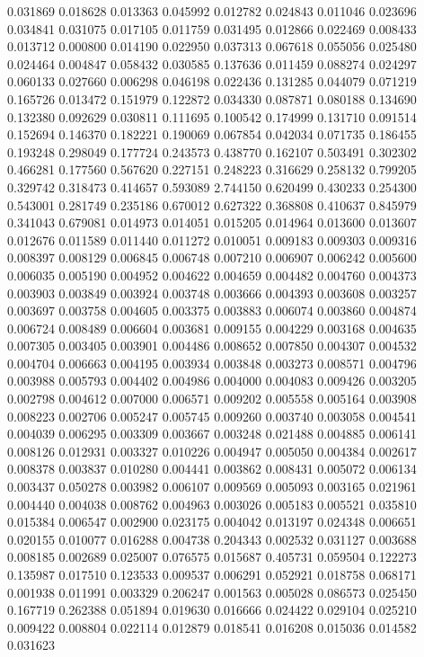 0.031869
0.018628
0.013363
0.045992
0.012782
0.024843
0.011046
0.023696
0.034841
0.031075
0.017105
0.011759
0.031495
0.012866
0.022469
0.008433
0.013712
0.000800
0.014190
0.022950
0.037313
0.067618
0.055056
0.025480
0.024464
0.004847
0.058432
0.030585
0.137636
0.011459
0.088274
0.024297
0.060133
0.027660
0.006298
0.046198
0.022436
0.131285
0.044079
0.071219
0.165726
0.013472
0.151979
0.122872
0.034330
0.087871
0.080188
0.134690
0.132380
0.092629
0.030811
0.111695
0.100542
0.174999
0.131710
0.091514
0.152694
0.146370
0.182221
0.190069
0.067854
0.042034
0.071735
0.186455
0.193248
0.298049
0.177724
0.243573
0.438770
0.162107
0.503491
0.302302
0.466281
0.177560
0.567620
0.227151
0.248223
0.316629
0.258132
0.799205
0.329742
0.318473
0.414657
0.593089
2.744150
0.620499
0.430233
0.254300
0.543001
0.281749
0.235186
0.670012
0.627322
0.368808
0.410637
0.845979
0.341043
0.679081
0.014973
0.014051
0.015205
0.014964
0.013600
0.013607
0.012676
0.011589
0.011440
0.011272
0.010051
0.009183
0.009303
0.009316
0.008397
0.008129
0.006845
0.006748
0.007210
0.006907
0.006242
0.005600
0.006035
0.005190
0.004952
0.004622
0.004659
0.004482
0.004760
0.004373
0.003903
0.003849
0.003924
0.003748
0.003666
0.004393
0.003608
0.003257
0.003697
0.003758
0.004605
0.003375
0.003883
0.006074
0.003860
0.004874
0.006724
0.008489
0.006604
0.003681
0.009155
0.004229
0.003168
0.004635
0.007305
0.003405
0.003901
0.004486
0.008652
0.007850
0.004307
0.004532
0.004704
0.006663
0.004195
0.003934
0.003848
0.003273
0.008571
0.004796
0.003988
0.005793
0.004402
0.004986
0.004000
0.004083
0.009426
0.003205
0.002798
0.004612
0.007000
0.006571
0.009202
0.005558
0.005164
0.003908
0.008223
0.002706
0.005247
0.005745
0.009260
0.003740
0.003058
0.004541
0.004039
0.006295
0.003309
0.003667
0.003248
0.021488
0.004885
0.006141
0.008126
0.012931
0.003327
0.010226
0.004947
0.005050
0.004384
0.002617
0.008378
0.003837
0.010280
0.004441
0.003862
0.008431
0.005072
0.006134
0.003437
0.050278
0.003982
0.006107
0.009569
0.005093
0.003165
0.021961
0.004440
0.004038
0.008762
0.004963
0.003026
0.005183
0.005521
0.035810
0.015384
0.006547
0.002900
0.023175
0.004042
0.013197
0.024348
0.006651
0.020155
0.010077
0.016288
0.004738
0.204343
0.002532
0.031127
0.003688
0.008185
0.002689
0.025007
0.076575
0.015687
0.405731
0.059504
0.122273
0.135987
0.017510
0.123533
0.009537
0.006291
0.052921
0.018758
0.068171
0.001938
0.011991
0.003329
0.206247
0.001563
0.005028
0.086573
0.025450
0.167719
0.262388
0.051894
0.019630
0.016666
0.024422
0.029104
0.025210
0.009422
0.008804
0.022114
0.012879
0.018541
0.016208
0.015036
0.014582
0.031623
